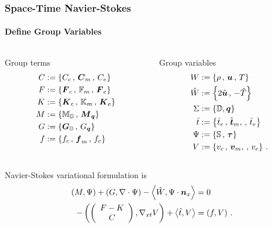 \documentclass[18pt,xcolor=table]{beamer}
\begin{document}
\begin{frame}[t]
\frametitle{Space-Time Navier-Stokes}
\framesubtitle{Define Group Variables}
\begin{columns}[t]
\begin{column}{0.5\textwidth}
Group terms
\vspace{-2ex}
\begin{align*}
C&:=\left\{ C_c\,,\, \boldsymbol C_m\,,\, C_e \right\}\\
F&:=\left\{ \boldsymbol F_c\,,\, \mathbb{F}_m\,,\, \boldsymbol F_e \right\}\\
K&:=\left\{ \boldsymbol K_c\,,\, \mathbb{K}_m\,,\, \boldsymbol K_e \right\}\\
M&:=\left\{ \mathbb{M}_{\mathbb{D}}\,,\, \boldsymbol M_{\boldsymbol q} \right\}\\
G&:=\left\{ \boldsymbol G_{\mathbb{D}}\,,\, G_{\boldsymbol q} \right\}\\
f&:=\left\{ f_c\,,\, \boldsymbol f_m\,,\, f_e \right\}\\
\end{align*}
\end{column}
\begin{column}{0.5\textwidth}
Group variables
\vspace{-2ex}
\begin{align*}
W&:=\left\{ \rho\,,\,\boldsymbol u\,,\,T \right\}\\
\hat W&:=\left\{ 2\hat{\boldsymbol u}\,,\,-\hat T \right\}\\
\Sigma&:=\left\{ \mathbb{D},\boldsymbol q \right\}\\
\hat t&:=\left\{ \hat t_e\,,\,\hat{\boldsymbol t}_m,\,,\,\hat t_e \right\}\\
\Psi&:=\left\{ \mathbb{S}\,,\,\boldsymbol\tau \right\}\\
V&:=\left\{ v_c\,,\,\boldsymbol v_m,\,,\,v_e \right\}\,.
\end{align*}
\end{column}
\end{columns}
Navier-Stokes variational formulation is
\begin{align*}
\left( M,\Psi \right)+\left( G,\nabla\cdot\Psi \right)-\left\langle \hat W,\Psi\cdot\boldsymbol n_x \right\rangle&=0\\
-\left( \left( \begin{array}{c} F-K\\ C\\ \end{array} \right),\nabla_{xt} V \right)+\left\langle \hat t,V \right\rangle&=\left( f,V \right)\,.
\end{align*}
\end{frame}
\end{document}

